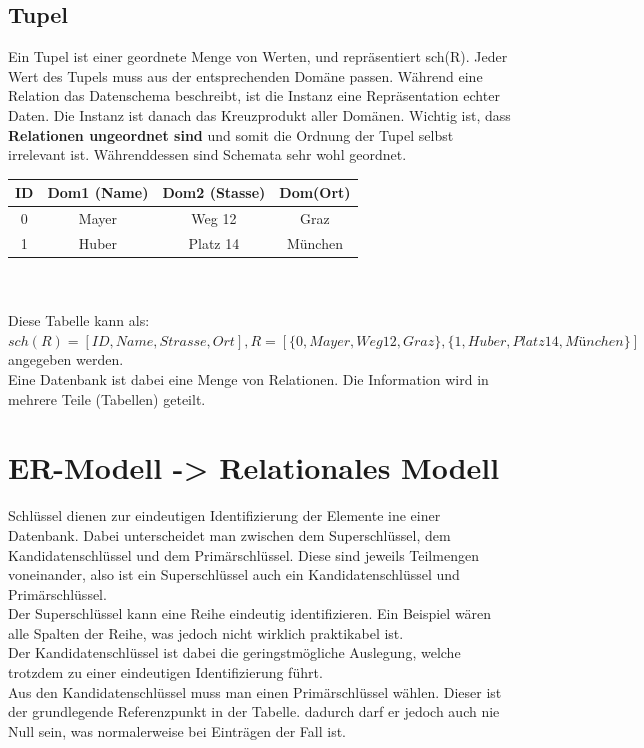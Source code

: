 \documentclass{article}
\begin{document}
	\subsection{Tupel}
	Ein Tupel ist einer geordnete Menge von Werten, und repräsentiert sch(R). Jeder Wert des Tupels muss aus der entsprechenden Domäne passen. Während eine Relation das Datenschema beschreibt, ist die Instanz eine Repräsentation echter Daten. Die Instanz ist danach das Kreuzprodukt aller Domänen. Wichtig ist, dass \textbf{Relationen ungeordnet sind} und somit die Ordnung der Tupel selbst irrelevant ist. Währenddessen sind Schemata sehr wohl geordnet.\\

	\begin{tabular}{| c | c | c | c |}
		\toprule
		ID & Dom1 (Name) & Dom2 (Stasse) & Dom(Ort) \\ \midrule
		0 & Mayer & Weg 12 & Graz \\ \hline
		1 & Huber & Platz 14 & München \\
		\bottomrule
	\end{tabular} \\ \\
	Diese Tabelle kann als: $sch(R)=[ID, Name, Strasse, Ort], R=[\{0, Mayer, Weg 12, Graz\}, \{1, Huber, Platz 14, München\}]$ angegeben werden. \\
	Eine Datenbank ist dabei eine Menge von Relationen. Die Information wird in mehrere Teile (Tabellen) geteilt.
	\section{ER-Modell -> Relationales Modell}
	Schlüssel dienen zur eindeutigen Identifizierung der Elemente ine einer Datenbank. Dabei unterscheidet man zwischen dem Superschlüssel, dem Kandidatenschlüssel und dem Primärschlüssel. Diese sind jeweils Teilmengen voneinander, also ist ein Superschlüssel auch ein Kandidatenschlüssel und Primärschlüssel. \\
	Der Superschlüssel kann eine Reihe eindeutig identifizieren. Ein Beispiel wären alle Spalten der Reihe, was jedoch nicht wirklich praktikabel ist. \\
	Der Kandidatenschlüssel ist dabei die geringstmögliche Auslegung, welche trotzdem zu einer eindeutigen Identifizierung führt. \\
	Aus den Kandidatenschlüssel muss man einen Primärschlüssel wählen. Dieser ist der grundlegende Referenzpunkt in der Tabelle. dadurch darf er jedoch auch nie Null sein, was normalerweise bei Einträgen der Fall ist.\\
\end{document}
